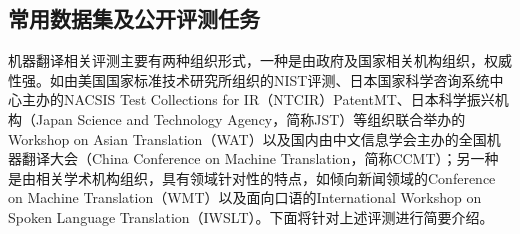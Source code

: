 
\subsection{常用数据集及公开评测任务}

\parinterval 机器翻译相关评测主要有两种组织形式，一种是由政府及国家相关机构组织，权威性强。如由美国国家标准技术研究所组织的NIST评测、日本国家科学咨询系统中心主办的NACSIS Test Collections for IR（NTCIR）PatentMT、日本科学振兴机构（Japan Science and Technology Agency，简称JST）等组织联合举办的Workshop on Asian Translation（WAT）以及国内由中文信息学会主办的全国机器翻译大会（China Conference on Machine Translation，简称CCMT）；另一种是由相关学术机构组织，具有领域针对性的特点，如倾向新闻领域的Conference on Machine Translation（WMT）以及面向口语的International Workshop on Spoken Language Translation（IWSLT）。下面将针对上述评测进行简要介绍。

